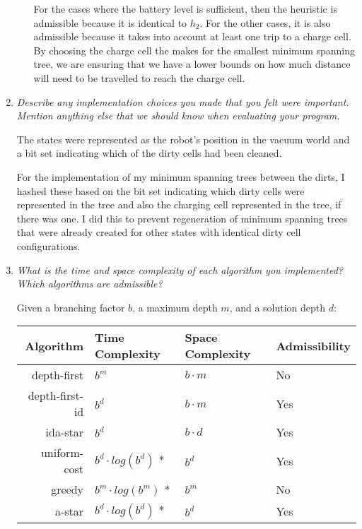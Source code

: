 \documentclass[letterpaper,11pt]{article}
\begin{document}
\begin{enumerate}
\begin{enumerate}
For the cases where the battery level is sufficient, then the heuristic is admissible because it is identical to $h_2$.  For the other cases, it is also admissible because it takes into account at least one trip to a charge cell.  By choosing the charge cell the makes for the smallest minimum spanning tree, we are ensuring that we have a lower bounds on how much distance will need to be travelled to reach the charge cell.
\end{enumerate}

\item \emph{Describe any implementation choices you made that you felt were important.  Mention anything else that we should know when evaluating your program.}

The states were represented as the robot's position in the vacuum world and a bit set indicating which of the dirty cells had been cleaned.

For the implementation of my minimum spanning trees between the dirts, I hashed these based on the bit set indicating which dirty cells were represented in the tree and also the charging cell represented in the tree, if there was one.  I did this to prevent regeneration of minimum spanning trees that were already created for other states with identical dirty cell configurations.

\item \emph{What is the time and space complexity of each algorithm you implemented? Which algorithms are admissible?}

Given a branching factor $b$, a maximum depth $m$, and a solution depth $d$:

\begin{center}
  \begin{tabular}{r | l | l | l  }
    Algorithm      & Time Complexity & Space Complexity & Admissibility \\ \hline
    \hline
    depth-first    & $b^m$            & $b \cdot m$      & No   \\ \hline
    depth-first-id & $b^d$            & $b \cdot m$      & Yes  \\ \hline
    ida-star       & $b^d$            & $b \cdot d$      & Yes  \\ \hline
    uniform-cost   & $b^d \cdot log(b^d)$ * & $b^d$            & Yes  \\ \hline
    greedy         & $b^m \cdot log(b^m)$ * & $b^m$            & No   \\ \hline
    a-star         & $b^d \cdot log(b^d)$ * & $b^d$            & Yes  \\ \hline
    \hline
  \end{tabular}
\end{center}


\end{enumerate}
\end{document}
